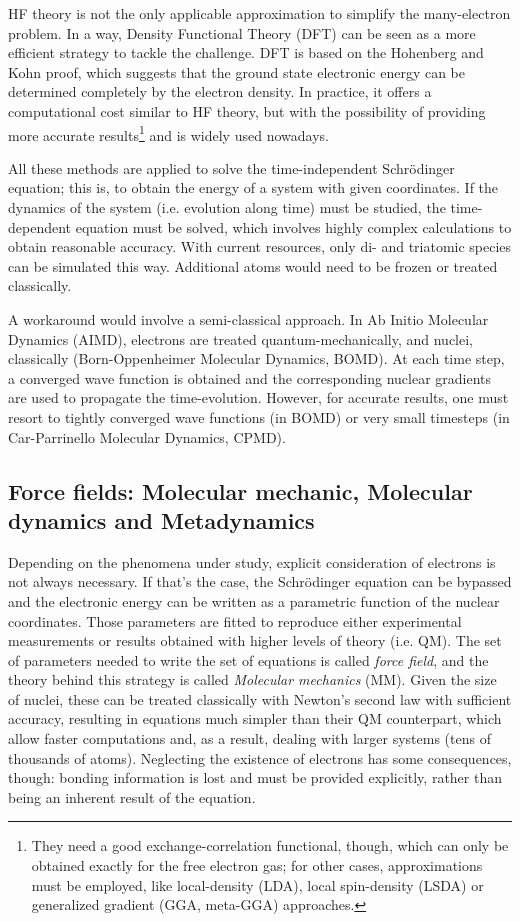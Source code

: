 HF theory is not the only applicable approximation to simplify the many-electron problem. In a way, Density Functional Theory (DFT) can be seen as a more efficient strategy to tackle the challenge. DFT is based on the Hohenberg and Kohn proof, which suggests that the ground state electronic energy can be determined completely by the electron density. In practice, it offers a computational cost similar to HF theory, but with the possibility of providing more accurate results\footnote{They need a good exchange-correlation functional, though, which can only be obtained exactly for the free electron gas; for other cases, approximations must be employed, like local-density (LDA), local spin-density (LSDA) or generalized gradient (GGA, meta-GGA) approaches.} and is widely used nowadays.

All these methods are applied to solve the time-independent Schrödinger equation; this is, to obtain the energy of a system with given coordinates. If the dynamics of the system (i.e. evolution along time) must be studied, the time-dependent equation must be solved, which involves highly complex calculations to obtain reasonable accuracy. With current resources, only di- and triatomic species can be simulated this way. Additional atoms would need to be frozen or treated classically.

A workaround would involve a semi-classical approach. In Ab Initio Molecular Dynamics (AIMD), electrons are treated quantum-mechanically, and nuclei, classically (Born-Oppenheimer Molecular Dynamics, BOMD). At each time step, a converged wave function is obtained and the corresponding nuclear gradients are used to propagate the time-evolution. However, for accurate results, one must resort to tightly converged wave functions (in BOMD) or very small timesteps (in Car-Parrinello Molecular Dynamics, CPMD).

\subsection{Force fields: Molecular mechanic, Molecular dynamics and Metadynamics}
\label{section:mm-md}
Depending on the phenomena under study, explicit consideration of electrons is not always necessary. If that’s the case, the Schrödinger equation can be bypassed and the electronic energy can be written as a parametric function of the nuclear coordinates. Those parameters are fitted to reproduce either experimental measurements or results obtained with higher levels of theory (i.e. QM). The set of parameters needed to write the set of equations is called \textit{force field}, and the theory behind this strategy is called \textit{Molecular mechanics} (MM). Given the size of nuclei, these can be treated classically with Newton’s second law with sufficient accuracy, resulting in equations much simpler than their QM counterpart, which allow faster computations and, as a result, dealing with larger systems (tens of thousands of atoms). Neglecting the existence of electrons has some consequences, though: bonding information is lost and must be provided explicitly, rather than being an inherent result of the equation.

